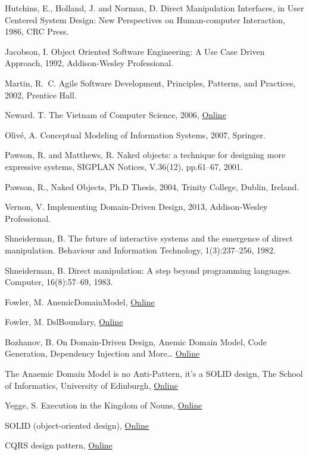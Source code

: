 \documentclass[a4paper,12pt,oneside,openright]{memoir}
\begin{document}
\begin{thebibliography}{5}
Hutchins, E., Holland, J. and Norman, D. Direct Manipulation Interfaces, in User Centered System Design: New Perspectives on Human-computer Interaction, 1986, CRC Press.

Jacobson, I. Object Oriented Software Engineering: A Use Case Driven Approach, 1992, Addison-Wesley Professional.

Martin, R.~C. Agile Software Development, Principles, Patterns, and Practices, 2002, Prentice Hall.

New\-ard. T. The Vietnam of Computer Science, 2006,
\href{http://blogs.tedneward.com/2006/06/26/The+Vietnam+Of+Computer+Science.aspx}{Online}

Oliv\'{e}, A. Conceptual Modeling of Information Systems, 2007, Springer.

Pawson, R. and Matthews, R. Naked objects: a technique for designing more expressive systems, SIGPLAN Notices, V.36(12), pp.61--67, 2001.

Pawson, R., Naked Objects, Ph.D Thesis, 2004, Trinity College, Dublin, Ireland.

Vernon, V. Implementing Domain-Driven Design, 2013, Addison-Wesley Professional.

Shneiderman, B. The future of interactive systems and the emergence of direct manipulation. Behaviour and Information Technology, 1(3):237–256, 1982.

Shneiderman, B. Direct manipulation: A step beyond programming languages. Computer, 16(8):57–69, 1983.

 Fowler, M. AnemicDomainModel, 
\href{http://www.martinfowler.com/bliki/AnemicDomainModel.html}{Online}

 Fowler, M. DslBoundary, 
\href{http://martinfowler.com/bliki/DslBoundary.html}{Online}

 Bozhanov, B. On Domain-Driven Design, Anemic Domain Model, Code Generation, Dependency Injection and More…
\href{http://techblog.bozho.net/on-domain-driven-design-anemic-domain-models-code-generation-dependency-injection-and-more/}{Online}

  The Anaemic Domain Model is no Anti-Pattern, it’s a SOLID design, The School of Informatics, University of Edinburgh,
\href{https://blog.inf.ed.ac.uk/sapm/2014/02/04/the-anaemic-domain-model-is-no-anti-pattern-its-a-solid-design/}{Online}

 Yegge, S. Execution in the Kingdom of Nouns,  
\href{http://steve-yegge.blogspot.com.au/2006/03/execution-in-kingdom-of-nouns.html}{Online}

 SOLID (object-oriented design), 
\href{https://en.wikipedia.org/wiki/SOLID_(object-oriented_design)}{Online}

 CQRS design pattern, 
\href{https://cqrs.files.wordpress.com/2010/11/cqrs_documents.pdf}{Online}

\end{thebibliography}
%
\end{document}
